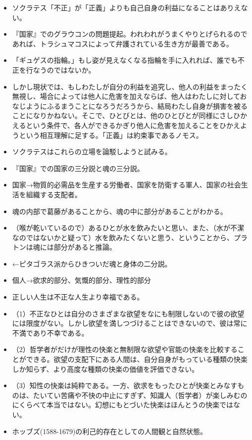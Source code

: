 \documentclass[uplatex]{bxjsarticle}
\begin{document}
\begin{itemize}
\item ソクラテス「不正」が「正義」よりも自己自身の利益になることはありえない。



\item 『国家』でのグラウコンの問題提起。われわれがうまくやりとげられるのであれば、トラシュマコスによって弁護されている生き方が最善である。


\item 「ギュゲスの指輪。」もし姿が見えなくなる指輪を手に入れれば、誰でも不正を行なうのではないか。


\item しかし現状では、もしわたしが自分の利益を追究し、他人の利益をまったく無視し、場合によっては他人に危害を加えならば、他人はわたしに対しておなじようにふるまうことになろうだろうから、結局わたし自身が損害を被ることになりかねない。そこで、ひとびとは、他のひとびとが同様にさしひかえるという条件で、各人ができるかぎり他人に危害を加えることをひかえようという相互理解に足する。「正義」は約束事であるノモス。


\item ソクラテスはこれらの立場を論駁しようと試みる。

\item 『国家』での国家の三分説と魂の三分説。

\item 国家→物質的必需品を生産する労働者、国家を防衛する軍人、国家の社会生活を組織する支配者。

\item 魂の内部で葛藤があることから、魂の中に部分があることがわかる。

\item （喉が乾いているので）あるひとが水を飲みたいと思い、また、（水が不潔なのではないかと疑って）水を飲みたくないと思う、ということから、プラトンは魂には部分があると推論。

\item ←ピタゴラス派からひきついだ魂と身体の二分説。

\item 個人→欲求的部分、気慨的部分、理性的部分

\item 正しい人生は不正な人生より幸福である。

\item （1）不正なひとは自分のさまざまな欲望をなにも制限しないので彼の欲望には限度がない。しかし欲望を満しつづけることはできないので、彼は常に不満であり不幸である。

\item （2）哲学者がだけが理性の快楽と無制限な欲望や官能の快楽を比較することができる。欲望の支配下にある人間は、自分自身がもっている種類の快楽しか知らず、より高度な種類の快楽の価値を評価できない。

\item （3）知性の快楽は純粋である。一方、欲求をもったひとが快楽とみなすものは、たいてい苦痛や不快の中止にすぎず、知識人（哲学者）が楽しみむのにくらべて本当ではない。幻想にもとづいた快楽はほんとうの快楽ではない。


\item ホッブズ(1588-1679)の利己的存在としての人間観と自然状態。

\end{itemize}
\end{document}
